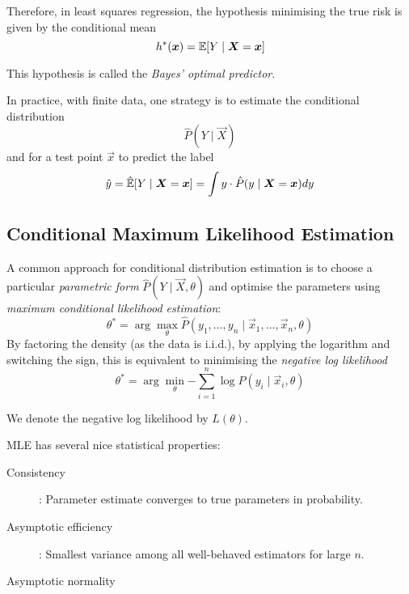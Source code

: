 Therefore, in least squares regression,
the hypothesis minimising the true risk
is given by the conditional mean
\begin{equation*}
    h^*(\boldsymbol{x}) = \mathbb{E}[Y \mid \boldsymbol{X} = \boldsymbol{x}]
\end{equation*}

This hypothesis is called the
\emph{Bayes' optimal predictor}.

In practice, with finite data, one strategy
is to estimate the conditional distribution
\begin{equation*}
    \hat{P}(Y \mid \vec{X})
\end{equation*}
and for a test point $\vec{x}$ to
predict the label
\begin{equation*}
    \hat{y} = \hat{\mathbb{E}}[Y \mid \boldsymbol{X} = \boldsymbol{x}]
    = \int{y \cdot \hat{P}(y \mid \boldsymbol{X} = \boldsymbol{x}) dy}
\end{equation*}


\subsection{Conditional Maximum Likelihood Estimation}
A common approach for conditional distribution estimation
is to choose a particular \emph{parametric form}
$\hat{P}(Y \mid \vec{X}, \theta)$
and optimise the parameters using
\emph{maximum conditional likelihood estimation}:
\begin{equation*}
    \theta^* = \arg\max_\theta{
        \hat{P}(y_1, \dotsc, y_n \mid \vec{x}_1, \dotsc, \vec{x}_n, \theta)
    }
\end{equation*}
By factoring the density (as the data is i.i.d.),
by applying the logarithm and switching the sign,
this is equivalent to minimising the
\emph{negative log likelihood}
\begin{equation*}
    \theta^* = \arg\min_\theta{
        -\sum_{i=1}^n{\log{\hat{P}(y_i \mid \vec{x}_i, \theta)}}
    }
\end{equation*}

We denote the negative log likelihood by $L(\theta)$.

MLE has several nice statistical properties:
\begin{description}
    \item[Consistency]: Parameter estimate
    converges to true parameters in probability.
    \item[Asymptotic efficiency]: Smallest
    variance among all well-behaved estimators
    for large $n$.
    \item[Asymptotic normality]
\end{description}


